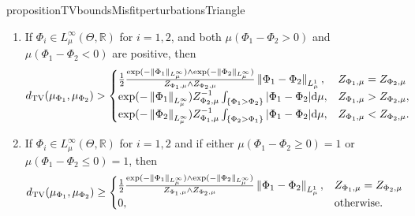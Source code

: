 \documentclass[a4paper]{scrartcl}
\theoremstyle{definition}
\numberwithin{equation}{section}
\newcommand{\R}{\mathbb{R}}
\newcommand{\rd}{\mathrm{d}}
\newcommand{\abs}[1]{\vert #1\vert}
\newcommand{\norm}[1]{\Vert #1 \Vert}
\newcommand{\Norm}[1]{\left\Vert #1 \right\Vert}
\newcommand{\TV}[0]{\textup{TV}}
\begin{document}
\begin{restatable}{proposition}{TVboundsMisfitperturbationsTriangle}
\begin{enumerate}
 \item 
 \label{item_proposition_TV_bounds_misfit_perturbations_via_triangle_inequality_lower_bound}
 If $\Phi_i\in L^\infty_\mu(\Theta,\R)$ for $i=1,2$, and both $\mu(\Phi_1-\Phi_2>0)$ and $\mu(\Phi_1-\Phi_2<0)$ are positive, then
 \begin{equation*}
  d_{\TV}(\mu_{\Phi_1},\mu_{\Phi_2})>
  \begin{cases}
  \frac{1}{2}\frac{\exp(-\norm{\Phi_1}_{L^\infty_\mu})\wedge\exp(- \norm{\Phi_2}_{L^\infty_\mu})}{Z_{\Phi_1,\mu}\wedge Z_{\Phi_2,\mu}}\Norm{\Phi_1-\Phi_2}_{L^1_\mu} , & Z_{\Phi_1,\mu}=Z_{\Phi_2,\mu}
  \\
  \exp(-\Norm{\Phi_1}_{L^\infty_\mu})Z_{\Phi_2,\mu}^{-1}\int_{\{\Phi_1>\Phi_2\}} \abs{\Phi_1-\Phi_2}\rd \mu, & Z_{\Phi_1,\mu}>Z_{\Phi_2,\mu},
  \\
  \exp(-\Norm{\Phi_2}_{L^\infty_\mu})Z_{\Phi_1,\mu}^{-1}\int_{\{\Phi_2>\Phi_1\}} \abs{\Phi_1-\Phi_2}\rd \mu, & Z_{\Phi_1,\mu}<Z_{\Phi_2,\mu}.
  \end{cases}
 \end{equation*}
 \item \label{item_proposition_TV_bounds_misfit_perturbations_via_triangle_inequality_lower_bound_no_sign_change}
   If $\Phi_i\in L^\infty_\mu(\Theta,\R)$ for $i=1,2$ and if either $\mu(\Phi_1-\Phi_2\geq 0)=1$ or $\mu(\Phi_1-\Phi_2\leq 0)=1$, then 
 \begin{equation*}
  d_{\TV}(\mu_{\Phi_1},\mu_{\Phi_2})\geq 
  \begin{cases}
  \frac{1}{2}\frac{\exp(-\norm{\Phi_1}_{L^\infty_\mu})\wedge\exp(- \norm{\Phi_2}_{L^\infty_\mu})}{Z_{\Phi_1,\mu}\wedge Z_{\Phi_2,\mu}}\Norm{\Phi_1-\Phi_2}_{L^1_\mu} , & Z_{\Phi_1,\mu}=Z_{\Phi_2,\mu}
  \\
  0, & \text{otherwise.}
  \end{cases}
 \end{equation*}
 \end{enumerate}
\end{restatable}
\end{document}

